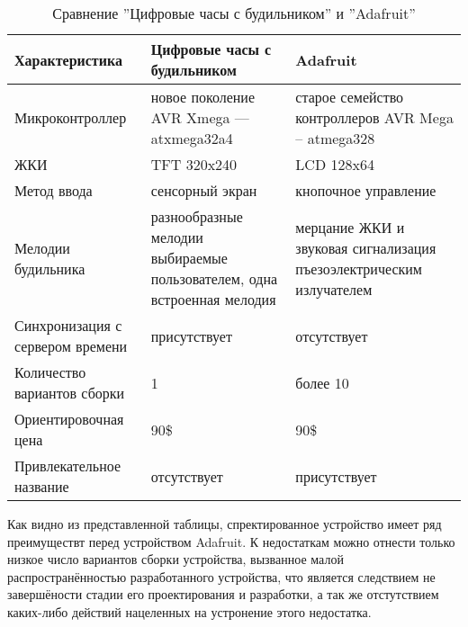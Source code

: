 \begin{par}
\begin{table}
\caption{Сравнение ''Цифровые часы с будильником'' и ''Adafruit''}
\begin{tabular}{|l|p{4cm}|p{4cm}|}
\hline{}
Характеристика & Цифровые часы с\linebreak{} будильником & Adafruit \\
\hline{}
Микроконтроллер & новое поколение AVR Xmega --- atxmega32a4 & старое семейство контроллеров AVR Mega -- atmega328 \\
\hline{}
ЖКИ & TFT 320x240 & LCD 128x64 \\
\hline{}
Метод ввода & сенсорный экран & кнопочное управление \\
\hline{}
Мелодии будильника & разнообразные мелодии выбираемые пользователем, одна встроенная мелодия & мерцание ЖКИ и звуковая сигнализация пъезоэлектрическим излучателем \\
\hline{}
Синхронизация с сервером времени & присутствует & отсутствует \\
\hline{}
Количество вариантов сборки & 1 & более 10 \\
\hline{}
Ориентировочная цена & 90\$ & 90\$ \\ 
\hline{}
Привлекательное название & отсутствует & присутствует \\ 
\hline
\end{tabular}
\label{table:compare}
\end{table}

Как видно из представленной таблицы, спректированное устройство имеет ряд преимуществт перед
устройством Adafruit. К недостаткам можно отнести только низкое число вариантов сборки устройства,
вызванное малой распространённостью разработанного устройства, что является
следствием не завершёности стадии его проектирования и разработки, а так же отстутствием каких-либо
действий нацеленных на устронение этого недостатка.
\end{par}
\newpage{}

